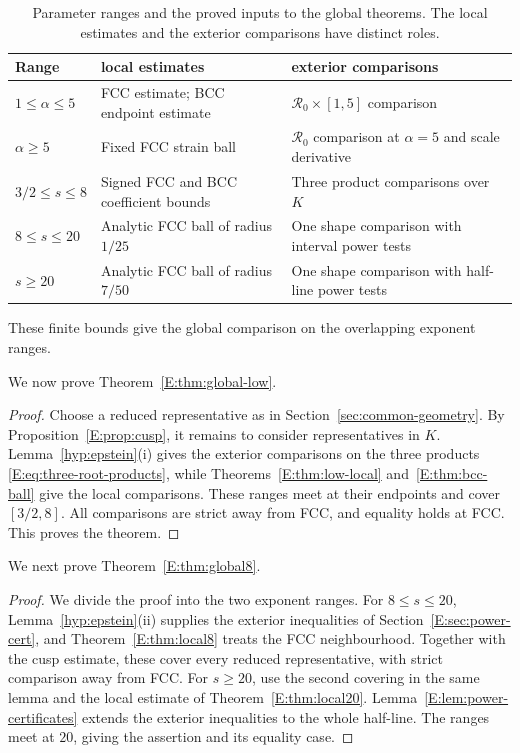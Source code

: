 \documentclass[reqno,english]{amsart}
\theoremstyle{definition}
\newtheorem{open problem}[theorem]{Open Problem}
\theoremstyle{remark}
\theoremstyle{plain}
\numberwithin{equation}{section}
\begin{document}
\begin{table}[ht]
\centering
\caption{Parameter ranges and the proved inputs to the global theorems.
The local estimates and the exterior comparisons have distinct roles.}
\label{tab:proof-dependencies}
\begin{tabular}{@{}p{}p{}p{}@{}}
\toprule
Range & local estimates & exterior comparisons\\
\midrule
$1\le\alpha\le5$ & FCC estimate; BCC endpoint estimate &
$\mathcal R_0\times[1,5]$ comparison\\[3pt]
$\alpha\ge5$ & Fixed FCC strain ball &
$\mathcal R_0$ comparison at $\alpha=5$ and scale derivative\\[3pt]
$3/2\le s\le8$ & Signed FCC and BCC coefficient bounds &
Three product comparisons over $K$\\[3pt]
$8\le s\le20$ & Analytic FCC ball of radius $1/25$ &
One shape comparison with interval power tests\\[3pt]
$s\ge20$ & Analytic FCC ball of radius $7/50$ &
One shape comparison with half-line power tests\\
\bottomrule
\end{tabular}
\end{table}
These finite bounds give the global comparison on the overlapping exponent ranges.

We now prove Theorem~\ref{E:thm:global-low}.

\begin{proof}
Choose a reduced representative as in
Section~\ref{sec:common-geometry}. By
Proposition~\ref{E:prop:cusp}, it remains to consider representatives
in $K$. Lemma~\ref{hyp:epstein}(i) gives the exterior comparisons
on the three products \eqref{E:eq:three-root-products}, while
Theorems~\ref{E:thm:low-local} and~\ref{E:thm:bcc-ball} give the
local comparisons. These ranges meet at their endpoints and cover
$[3/2,8]$. All comparisons are strict away from FCC, and equality
holds at FCC. This proves the theorem.
\end{proof}


We next prove Theorem~\ref{E:thm:global8}.

\begin{proof}
We divide the proof into the two exponent ranges. For
$8\le s\le20$, Lemma~\ref{hyp:epstein}(ii) supplies the exterior
inequalities of Section~\ref{E:sec:power-cert}, and
Theorem~\ref{E:thm:local8} treats the FCC neighbourhood. Together
with the cusp estimate, these cover every reduced representative,
with strict comparison away from FCC. For $s\ge20$, use the second
covering in the same lemma and the local estimate of
Theorem~\ref{E:thm:local20}. Lemma~\ref{E:lem:power-certificates}
extends the exterior inequalities to the whole half-line. The ranges
meet at $20$, giving the assertion and its equality case.
\end{proof}
\end{document}

